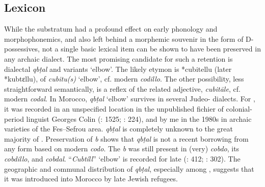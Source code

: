 \documentclass[output=paper]{langsci/langscibook}
\begin{document}
\subsection{Lexicon}

While the  substratum had a profound effect on early  phonology and morphophonemics, and also left behind a morphemic souvenir in the form of D-possessives, not a single basic  lexical item can be shown to have been preserved in any archaic  dialect. The most promising candidate for such a retention is dialectal  \textit{qbṭal} and variants ‘elbow’. The likely etymon is  *cubitellu (later  *kubtɛllu),  of  \textit{cubitu(s)} ‘elbow’, cf. modern  \textit{codillo}. The other possibility, less straightforward semantically, is a reflex of the related adjective,  \textit{cubitāle}, cf. modern  \textit{codal}. In Morocco, \textit{qbṭal} ‘elbow’ survives in several Judeo- dialects. For , it was recorded in an unspecified location in the unpublished fichier of colonial-period linguist Georges Colin (\citealt{IraquiSinaceur1993}: 1525; \citealt{Prémare1998}: 224), and by me in the 1980s in archaic varieties of the Fes--Sefrou area. \textit{qbṭal} is completely unknown to the great majority of  . Preservation of \textit{b} shows that \textit{qbṭal} is not a recent borrowing from any form based on modern  \textit{codo}. The \textit{b} was still present in (very)   \textit{cobdo}, its  \textit{cobdillo}, and \textit{cobdal}. “\textit{Cubtíll}” ‘elbow’ is recorded for late   (\citealt{Corriente1997dictionary}: 412; \citealt{Dozy1967}: 302). The geographic and communal distribution of \textit{qbṭal}, especially among , suggests that it was introduced into Morocco by late  Jewish refugees. 
\end{document}
